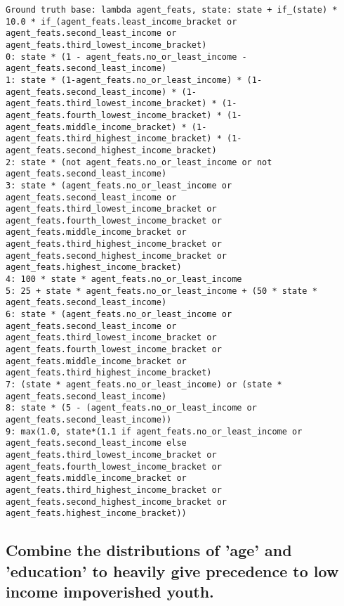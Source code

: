 \begin{lstlisting}
Ground truth base: lambda agent_feats, state: state + if_(state) * 10.0 * if_(agent_feats.least_income_bracket or agent_feats.second_least_income or agent_feats.third_lowest_income_bracket)
0: state * (1 - agent_feats.no_or_least_income - agent_feats.second_least_income) 
1: state * (1-agent_feats.no_or_least_income) * (1-agent_feats.second_least_income) * (1-agent_feats.third_lowest_income_bracket) * (1-agent_feats.fourth_lowest_income_bracket) * (1-agent_feats.middle_income_bracket) * (1-agent_feats.third_highest_income_bracket) * (1-agent_feats.second_highest_income_bracket) 
2: state * (not agent_feats.no_or_least_income or not agent_feats.second_least_income) 
3: state * (agent_feats.no_or_least_income or agent_feats.second_least_income or agent_feats.third_lowest_income_bracket or agent_feats.fourth_lowest_income_bracket or agent_feats.middle_income_bracket or agent_feats.third_highest_income_bracket or agent_feats.second_highest_income_bracket or agent_feats.highest_income_bracket) 
4: 100 * state * agent_feats.no_or_least_income 
5: 25 + state * agent_feats.no_or_least_income + (50 * state * agent_feats.second_least_income) 
6: state * (agent_feats.no_or_least_income or agent_feats.second_least_income or agent_feats.third_lowest_income_bracket or agent_feats.fourth_lowest_income_bracket or agent_feats.middle_income_bracket or agent_feats.third_highest_income_bracket) 
7: (state * agent_feats.no_or_least_income) or (state * agent_feats.second_least_income) 
8: state * (5 - (agent_feats.no_or_least_income or agent_feats.second_least_income)) 
9: max(1.0, state*(1.1 if agent_feats.no_or_least_income or agent_feats.second_least_income else agent_feats.third_lowest_income_bracket or agent_feats.fourth_lowest_income_bracket or agent_feats.middle_income_bracket or agent_feats.third_highest_income_bracket or agent_feats.second_highest_income_bracket or agent_feats.highest_income_bracket)) 

\end{lstlisting}
\subsection{Combine the distributions of 'age' and 'education' to heavily give precedence to low income impoverished youth.}

